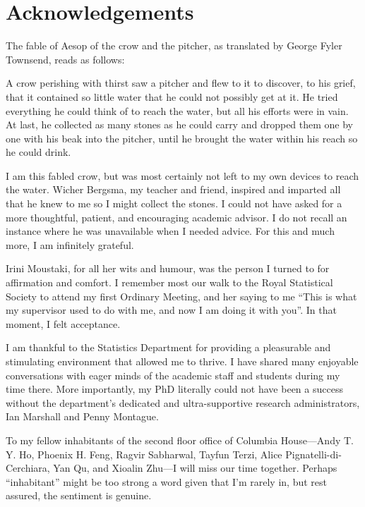\documentclass[11pt,twoside,openright,showframe]{report}
\begin{document}
\chapter*{Acknowledgements} 

The fable of Aesop of the crow and the pitcher, as translated by George Fyler Townsend, reads as follows:

\begingroup
\singlespacing
\begin{displayquote}
A crow perishing with thirst saw a pitcher and flew to it to discover, to his grief, that it contained so little water that he could not possibly get at it. 
He tried everything he could think of to reach the water, but all his efforts were in vain. 
At last, he collected as many stones as he could carry and dropped them one by one with his beak into the pitcher, until he brought the water within his reach so he could drink.
\end{displayquote}
\endgroup

I am this fabled crow, but was most certainly not left to my own devices to reach the water.
Wicher Bergsma, my teacher and friend, inspired and imparted all that he knew to me so I might collect the stones.
I could not have asked for a more thoughtful, patient, and encouraging academic advisor.
I do not recall an instance where he was unavailable when I needed  advice.
For this and much more, I am infinitely grateful.

Irini Moustaki, for all her wits and humour, was the person I turned to for affirmation and comfort. 
I remember most our walk to the Royal Statistical Society to attend my first Ordinary Meeting, and her saying to me ``This is what my supervisor used to do with me, and now I am doing it with you''. 
In that moment, I felt acceptance.

I am thankful to the Statistics Department for providing a pleasurable and stimulating environment that allowed me to thrive.
I have shared many enjoyable conversations with eager minds of the academic staff and students during my time there.
More importantly, my PhD literally could not have been a success without the department's dedicated and ultra-supportive research administrators, Ian Marshall and Penny Montague.

To my fellow inhabitants of the second floor office of Columbia House---Andy T. Y. Ho, Phoenix H. Feng, Ragvir Sabharwal, Tayfun Terzi, Alice Pignatelli-di-Cerchiara, Yan Qu, and Xioalin Zhu---I will miss our time together.
Perhaps ``inhabitant'' might be too strong a word given that I'm rarely in, but rest assured, the sentiment is genuine.
\end{document}
